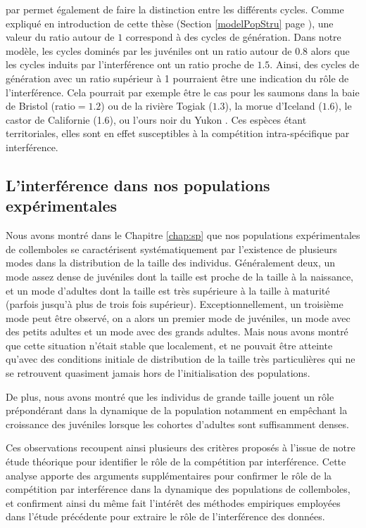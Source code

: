 \begin{enumerate*}[label=(\roman*)]
par \textcites{murdoch2002a} permet également de faire la distinction entre les
différents cycles. Comme expliqué en introduction de cette thèse
(Section \ref{modelPopStru} page \pageref{modelPopStru}), une valeur du ratio
autour de $1$ correspond à des cycles de génération. Dans notre modèle, les
cycles dominés par les juvéniles ont un ratio autour de $0.8$ alors que les cycles induits par l'interférence ont un
ratio proche de $1.5$. Ainsi, des cycles de génération avec un ratio supérieur
à 1 pourraient être une indication du rôle de l'interférence. Cela pourrait par
exemple être le cas pour les saumons dans la baie de Bristol (ratio$=1.2$) ou de
la rivière Togiak ($1.3$), la morue d'Iceland ($1.6$), le castor de Californie
(1.6), ou l'ours noir du Yukon \autocites[1.5,][]{murdoch2002a}. Ces espèces
étant territoriales, elles sont en effet susceptibles à la compétition intra-spécifique par interférence. 
\end{enumerate*}

\subsection{L'interférence dans nos populations expérimentales}

Nous avons montré dans le Chapitre \ref{chap:sp} que nos populations
expérimentales de collemboles se caractérisent systématiquement par
l'existence de plusieurs modes dans la distribution de la taille des individus.
Généralement deux, un mode assez dense de juvéniles dont la taille est proche de
la taille à la naissance, et un mode d'adultes dont la taille est très
supérieure à la taille à maturité (parfois jusqu'à plus de trois fois
supérieur). Exceptionnellement, un troisième mode peut être observé, on a alors
un premier mode de juvéniles, un mode avec des petits adultes et un mode avec
des grands adultes. Mais nous avons montré que cette situation n'était stable
que localement, et ne pouvait être atteinte qu'avec des conditions initiale de
distribution de la taille très particulières qui ne se retrouvent quasiment
jamais hors de l'initialisation des populations.

De plus, nous avons montré que les individus de grande taille jouent un rôle
prépondérant dans la dynamique de la population notamment en empêchant la
croissance des juvéniles lorsque les cohortes d'adultes sont suffisamment
denses. 

Ces observations recoupent ainsi plusieurs des critères proposés à l'issue de
notre étude théorique pour identifier le rôle de la compétition par
interférence. Cette analyse apporte des arguments supplémentaires pour confirmer
le rôle de la compétition par interférence dans la dynamique des populations de
collemboles, et confirment ainsi du même fait l'intérêt des méthodes empiriques
employées dans l'étude précédente pour extraire le rôle de
l'interférence des données.


